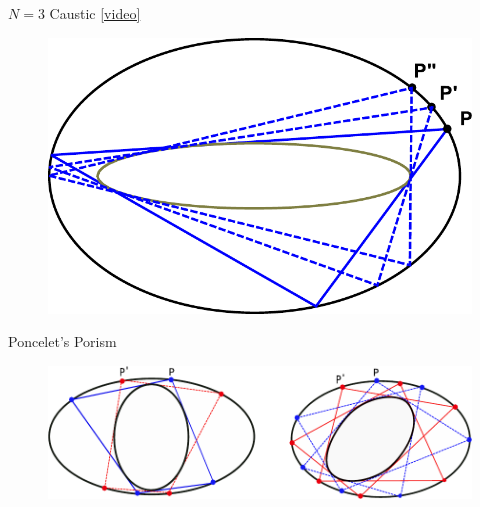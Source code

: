 
\begin{frame}{$N=3$ Caustic \href{https://youtu.be/Y3q35DObfZU}{[video]}}
\begin{figure}
\includegraphics[height=.7\textheight]{pics/0010_three_orbits.pdf}
\end{figure}
\end{frame}

\begin{frame}{Poncelet's Porism}
\begin{figure}
    \centering
    \includegraphics[width=\textwidth]{pics/0003_poncelet_porism.pdf}
\end{figure}
\end{frame}


